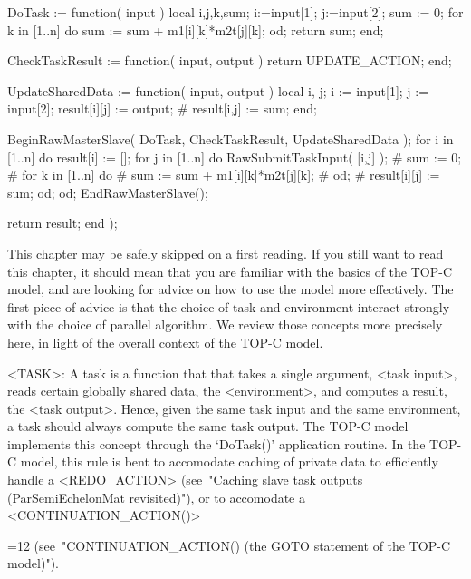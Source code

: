   DoTask := function( input )
    local i,j,k,sum;
    i:=input[1]; j:=input[2];
    sum := 0;
    for k in [1..n] do
      sum := sum + m1[i][k]*m2t[j][k];
    od;
    return sum;
  end;

  CheckTaskResult := function( input, output )
    return UPDATE_ACTION;
  end;

  UpdateSharedData := function( input, output )
    local i, j;
    i := input[1]; j := input[2];
    result[i][j] := output;
    # result[i,j] := sum;
  end;

  BeginRawMasterSlave( DoTask, CheckTaskResult, UpdateSharedData );
  for i in [1..n] do
    result[i] := [];
    for j in [1..n] do
      RawSubmitTaskInput( [i,j] );
      # sum := 0;
      # for k in [1..n] do
      #   sum := sum + m1[i][k]*m2t[j][k];
      # od;
      # result[i][j] := sum;
    od;
  od;
  EndRawMasterSlave();

  return result;
end );
\endexample




This chapter may be safely skipped on a first reading.  If you still
want to read this chapter, it should mean that you are familiar with
the basics of the TOP-C model, and are looking for advice on how to
use the model more effectively.  The first piece of advice is that the
choice of task and environment interact strongly with the choice of
parallel algorithm.  We review those concepts more precisely here, in
light of the overall context of the TOP-C model.


<TASK>:  A task is a function that that takes a single argument, <task
input>, reads certain globally shared data, the <environment>, and
computes a result, the <task output>.  Hence, given the same task input and
the same environment, a task should always compute the same task
output.  The TOP-C model implements this concept through the
`DoTask()' application routine.
In the TOP-C model, this rule is bent to accomodate caching of private
data to efficiently handle a <REDO_ACTION> (see~"Caching slave task
outputs (ParSemiEchelonMat revisited)"), or to accomodate a
<CONTINUATION_ACTION()>
{=12
(see~"CONTINUATION_ACTION() (the GOTO statement
of the TOP-C model)").
\par}

